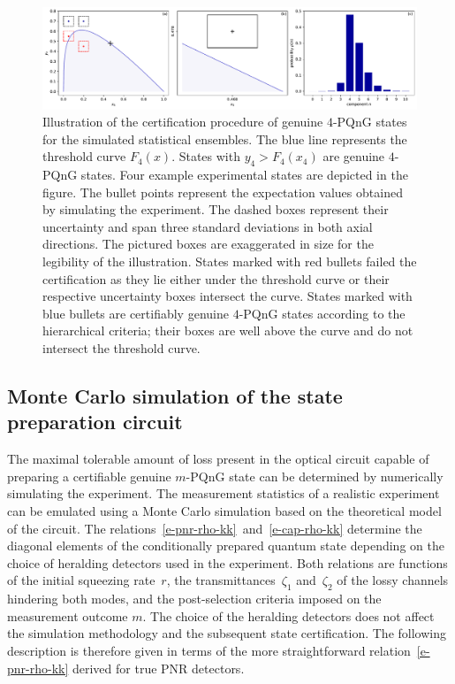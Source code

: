 \documentclass{article}
\begin{document}
\begin{figure}[h]
  \bgroup
    \hspace*{-0.125\columnwidth}\includegraphics[width = 1.25 \columnwidth]{import/illustrate_process.pdf}
  \egroup
  \caption{
    Illustration of the certification procedure of genuine $4$-PQnG states for the simulated statistical ensembles. The blue line represents the threshold curve $F_{4} (x)$. States with $y_{4} > F_{4}(x_{4})$ are genuine $4$-PQnG states. Four example experimental states are depicted in the figure. The bullet points represent the expectation values obtained by simulating the experiment. The dashed boxes represent their uncertainty and span three standard deviations in both axial directions. The pictured boxes are exaggerated in size for the legibility of the illustration. States marked with red bullets failed the certification as they lie either under the threshold curve or their respective uncertainty boxes intersect the curve. States marked with blue bullets are certifiably genuine $4$-PQnG states according to the hierarchical criteria; their boxes are well above the curve and do not intersect the threshold curve.
  }
  \label{f-otm-il}
\end{figure}

%

\subsection*{Monte Carlo simulation of the state preparation circuit}

The maximal tolerable amount of loss present in the optical circuit capable of preparing a certifiable genuine $m$-PQnG state can be determined by numerically simulating the experiment. The measurement statistics of a realistic experiment can be emulated using a Monte Carlo simulation based on the theoretical model of the circuit. The relations~\eqref{e-pnr-rho-kk}~and~\eqref{e-cap-rho-kk} determine the diagonal elements of the conditionally prepared quantum state depending on the choice of heralding detectors used in the experiment. Both relations are functions of the initial squeezing rate~$r$, the transmittances~$\zeta_{1}$ and~$\zeta_{2}$ of the lossy channels hindering both modes, and the post-selection criteria imposed on the measurement outcome $m$. The choice of the heralding detectors does not affect the simulation methodology and the subsequent state certification. The following description is therefore given in terms of the more straightforward relation~\eqref{e-pnr-rho-kk} derived for true PNR detectors.
\end{document}
